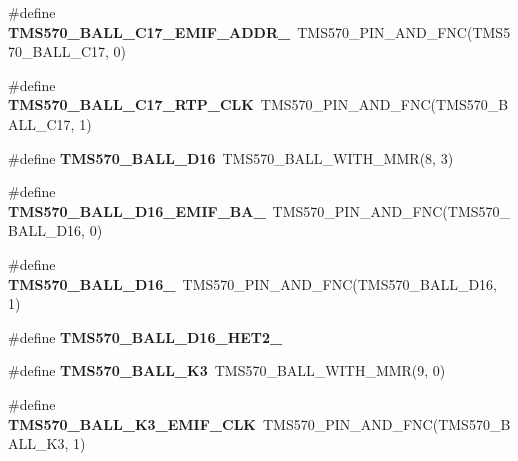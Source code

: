 \begin{DoxyCompactItemize}
\#define {\bfseries T\+M\+S570\+\_\+\+B\+A\+L\+L\+\_\+\+C17\+\_\+\+E\+M\+I\+F\+\_\+\+A\+D\+D\+R\+\_}~T\+M\+S570\+\_\+\+P\+I\+N\+\_\+\+A\+N\+D\+\_\+\+F\+NC(T\+M\+S570\+\_\+\+B\+A\+L\+L\+\_\+\+C17, 0)
\item 
\mbox{\label{tms570lc4357-pins_8h_a92a55b1169cb9770342a10d633434f7e}} 
\#define {\bfseries T\+M\+S570\+\_\+\+B\+A\+L\+L\+\_\+\+C17\+\_\+\+R\+T\+P\+\_\+\+C\+LK}~T\+M\+S570\+\_\+\+P\+I\+N\+\_\+\+A\+N\+D\+\_\+\+F\+NC(T\+M\+S570\+\_\+\+B\+A\+L\+L\+\_\+\+C17, 1)
\item 
\mbox{\label{tms570lc4357-pins_8h_a30cedbdacdafcc0c2a6b3c1ecfeaa678}} 
\#define {\bfseries T\+M\+S570\+\_\+\+B\+A\+L\+L\+\_\+\+D16}~T\+M\+S570\+\_\+\+B\+A\+L\+L\+\_\+\+W\+I\+T\+H\+\_\+\+M\+MR(8, 3)
\item 
\mbox{\label{tms570lc4357-pins_8h_aa5e74a97beaf050242b01731548dc926}} 
\#define {\bfseries T\+M\+S570\+\_\+\+B\+A\+L\+L\+\_\+\+D16\+\_\+\+E\+M\+I\+F\+\_\+\+B\+A\+\_}~T\+M\+S570\+\_\+\+P\+I\+N\+\_\+\+A\+N\+D\+\_\+\+F\+NC(T\+M\+S570\+\_\+\+B\+A\+L\+L\+\_\+\+D16, 0)
\item 
\mbox{\label{tms570lc4357-pins_8h_a93c270caf1aa3912efe8bb016dd0ea21}} 
\#define {\bfseries T\+M\+S570\+\_\+\+B\+A\+L\+L\+\_\+\+D16\+\_\+}~T\+M\+S570\+\_\+\+P\+I\+N\+\_\+\+A\+N\+D\+\_\+\+F\+NC(T\+M\+S570\+\_\+\+B\+A\+L\+L\+\_\+\+D16, 1)
\item 
\#define {\bfseries T\+M\+S570\+\_\+\+B\+A\+L\+L\+\_\+\+D16\+\_\+\+H\+E\+T2\+\_}
\item 
\mbox{\label{tms570lc4357-pins_8h_aec0e3d68e00d028d41feca28c6190aa2}} 
\#define {\bfseries T\+M\+S570\+\_\+\+B\+A\+L\+L\+\_\+\+K3}~T\+M\+S570\+\_\+\+B\+A\+L\+L\+\_\+\+W\+I\+T\+H\+\_\+\+M\+MR(9, 0)
\item 
\mbox{\label{tms570lc4357-pins_8h_a34c220c13a0c17c5b526637f6856358d}} 
\#define {\bfseries T\+M\+S570\+\_\+\+B\+A\+L\+L\+\_\+\+K3\+\_\+\+E\+M\+I\+F\+\_\+\+C\+LK}~T\+M\+S570\+\_\+\+P\+I\+N\+\_\+\+A\+N\+D\+\_\+\+F\+NC(T\+M\+S570\+\_\+\+B\+A\+L\+L\+\_\+\+K3, 1)
\item 
\mbox{\label{tms570lc4357-pins_8h_ac39333ab4c438ddda7cd7d0ad4830a23}} 

\end{DoxyCompactItemize}
